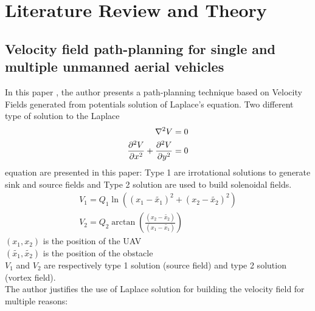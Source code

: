 \section{Literature Review and Theory}
\subsection{Velocity field path-planning for single and multiple unmanned aerial vehicles \cite{mcinnes2003velocity}}
In this paper \cite{farinha2020unmanned}, the author presents a path-planning technique based on Velocity Fields generated from potentials solution of Laplace's equation.
Two different type of solution to the Laplace 
\begin{align} %
    \laplacian{V} &=0 \nonumber \\
    \frac{\partial^2 V}{\partial x^2}+\dpd[2]{V}{y} &=0 \label{eq:Laplace} %
\end{align}
equation are presented in this paper: Type 1 are irrotational solutions to generate sink and source fields and Type 2 solution are used to build solenoidal fields.
\begin{align} %
    {V}_{1} = {Q}_{1} \ln(({x}_{1}-\tilde{{x}_{1}})^2+({x}_{2}-\tilde{{x}_{2}})^2) \\
    {V}_{2} = {Q}_{2} \arctan(\frac{({x}_{2}-\tilde{{x}_{2}})}{({x}_{1}-\tilde{{x}_{1}})})
\end{align}
$({x}_{1},{x}_{2})$ is the position of the UAV\\
$(\tilde{{x}_{1}}, \tilde{{x}_{2}})$ is the position of the obstacle\\
${V}_{1}$ and ${V}_{2}$ are respectively type 1 solution (source field) and type 2 solution (vortex field). \\
The author justifies the use of Laplace solution for building the velocity field for multiple reasons:

